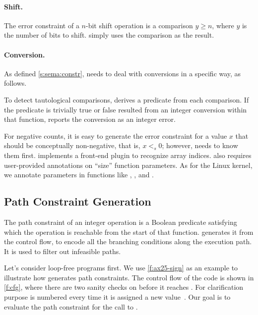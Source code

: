 \paragraph{Shift.}
The error constraint of a $n$-bit shift operation is a
comparison $y \geq n$, where $y$ is the number of bits to shift.
\sys simply uses the comparison as the result.

\paragraph{Conversion.}
As defined \autoref{s:sema:constr}, \sys needs to deal with conversions
in a specific way, as follows.

To detect tautological comparisons, \sys derives a predicate from
each comparison.  If the predicate is trivially true or false
resulted from an integer conversion within that function, \sys
reports the conversion as an integer error.

For negative counts, it is easy to generate the error constraint
for a value $x$ that should be conceptually non-negative, that is,
$x <_s 0$; however, \sys needs to know them first.  \sys implements
a front-end plugin to recognize array indices.  \sys also requires
user-provided annotations on ``size'' function parameters.  As for
the Linux kernel, we annotate parameters in functions like ,
, and .

\subsection{Path Constraint Generation}
\label{s:gen:path}

The path constraint of an integer operation is a Boolean predicate
satisfying which the operation is reachable from the start of that
function.  \sys generates it from the control flow, to encode all
the branching conditions along the execution path.  It is used to
filter out infeasible paths.

Let's consider loop-free programs first.
%
We use \autoref{f:ax25-sign} as an example to illustrate how \sys
generates path constraints.  The control flow of the code is shown
in \autoref{f:cfg}, where there are two sanity checks on 
before it reaches .  For clarification purpose
 is numbered every time it is assigned a new
value~\cite[\chapterautorefname~8.11]{whale}.  Our goal is to
evaluate the path constraint for the call to .


